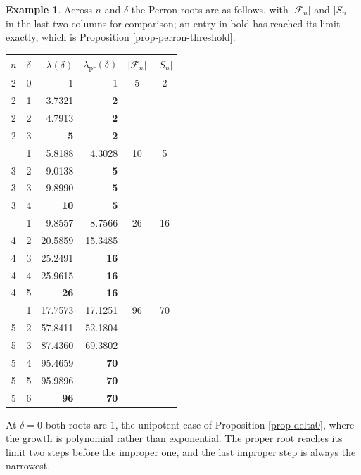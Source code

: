 \documentclass[11pt, a4paper, abstract=yes]{scrartcl}
\theoremstyle{definition}
\newtheorem{mexample}[definition]{Example}
\theoremstyle{remark}
\theoremstyle{plain}
\begin{document}
\begin{mexample}
Across \(n\) and \(\delta\) the Perron roots are as follows, with \(\lvert\mathcal F_n\rvert\) and
\(\lvert S_n\rvert\) in the last two columns for comparison; an entry in bold has reached its limit
exactly, which is Proposition \ref{prop-perron-threshold}.
\begingroup\small
\begin{center}
\begin{tabular}{@{}cc rr cc@{}}
  \toprule
  \(n\) & \(\delta\) & \(\lambda(\delta)\) & \(\lambda_{\mathrm{pr}}(\delta)\)
        & \(\lvert\mathcal F_n\rvert\) & \(\lvert S_n\rvert\)\\
  \midrule
  2 & 0 & 1 & 1 & 5 & 2\\
  2 & 1 & 3.7321 & \textbf{2} & &\\
  2 & 2 & 4.7913 & \textbf{2} & &\\
  2 & 3 & \textbf{5} & \textbf{2} & &\\
  \addlinespace
  3 & 1 & 5.8188 & 4.3028 & 10 & 5\\
  3 & 2 & 9.0138 & \textbf{5} & &\\
  3 & 3 & 9.8990 & \textbf{5} & &\\
  3 & 4 & \textbf{10} & \textbf{5} & &\\
  \addlinespace
  4 & 1 & 9.8557 & 8.7566 & 26 & 16\\
  4 & 2 & 20.5859 & 15.3485 & &\\
  4 & 3 & 25.2491 & \textbf{16} & &\\
  4 & 4 & 25.9615 & \textbf{16} & &\\
  4 & 5 & \textbf{26} & \textbf{16} & &\\
  \addlinespace
  5 & 1 & 17.7573 & 17.1251 & 96 & 70\\
  5 & 2 & 57.8411 & 52.1804 & &\\
  5 & 3 & 87.4360 & 69.3802 & &\\
  5 & 4 & 95.4659 & \textbf{70} & &\\
  5 & 5 & 95.9896 & \textbf{70} & &\\
  5 & 6 & \textbf{96} & \textbf{70} & &\\
  \bottomrule
\end{tabular}
\end{center}
\endgroup
At \(\delta=0\) both roots are \(1\), the unipotent case of Proposition \ref{prop-delta0}, where the
growth is polynomial rather than exponential. The proper root reaches its limit two steps before the
improper one, and the last improper step is always the narrowest.
\label{mex-recurrences}
\end{mexample}
\end{document}
